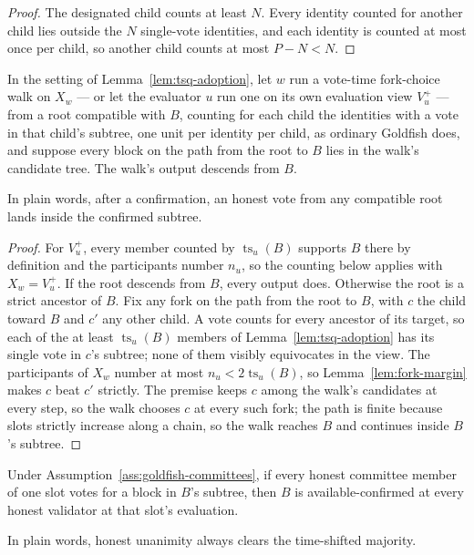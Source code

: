 \begin{proof}
The designated child counts at least \(N\).  Every identity counted for
another child lies outside the \(N\) single-vote identities, and each
identity is counted at most once per child, so another child counts at
most \(P-N<N\).
\end{proof}

\begin{corollary}
\label{cor:tsq-walk}
In the setting of Lemma~\ref{lem:tsq-adoption}, let \(w\) run a vote-time
fork-choice walk on \(X_w\) --- or let the evaluator \(u\) run one on its
own evaluation view \(V_u^+\) --- from a root compatible with \(B\),
counting for each child the identities with a vote in that child's
subtree, one unit per identity per child, as ordinary Goldfish does, and
suppose every block on the path from the root to \(B\)
lies in the walk's candidate tree.  The walk's output descends from \(B\).

In plain words, after a confirmation, an honest vote from any compatible
root lands inside the confirmed subtree.
\end{corollary}

\begin{proof}
For \(V_u^+\), every member counted by \(\operatorname{ts}_u(B)\) supports \(B\) there by
definition and the participants number \(n_u\), so the counting below
applies with \(X_w=V_u^+\).  If the root descends from \(B\), every output
does.  Otherwise the root is a strict ancestor of \(B\).  Fix any fork on the path from the root to
\(B\), with \(c\) the child toward \(B\) and \(c'\) any other child.
A vote counts for every ancestor of its target, so each of the at least
\(\operatorname{ts}_u(B)\) members of Lemma~\ref{lem:tsq-adoption} has its single vote in
\(c\)'s subtree; none of them visibly equivocates in the view.  The
participants of \(X_w\) number at most \(n_u<2\operatorname{ts}_u(B)\), so
Lemma~\ref{lem:fork-margin} makes \(c\) beat \(c'\) strictly.
The premise keeps \(c\) among the walk's candidates at every step, so the
walk chooses \(c\) at every such fork; the path is finite because slots
strictly increase along a chain, so the walk reaches \(B\) and continues
inside \(B\)'s subtree.
\end{proof}

\begin{lemma}
\label{lem:tsq-liveness}
Under Assumption~\ref{ass:goldfish-committees}, if every honest committee
member of one slot votes for a block in \(B\)'s subtree, then \(B\) is
available-confirmed at every honest validator at that slot's evaluation.

In plain words, honest unanimity always clears the time-shifted majority.
\end{lemma}

